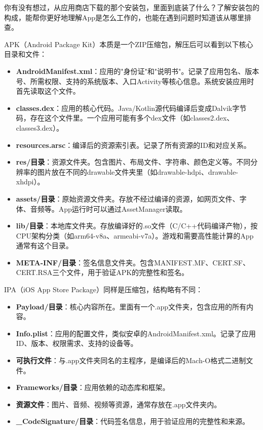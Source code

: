 
你有没有想过，从应用商店下载的那个安装包，里面到底装了什么？了解安装包的构成，能帮你更好地理解App是怎么工作的，也能在遇到问题时知道该从哪里排查。


APK（Android Package Kit）本质是一个ZIP压缩包，解压后可以看到以下核心目录和文件：

\begin{itemize}
  \item \textbf{AndroidManifest.xml}：应用的"身份证"和"说明书"。记录了应用包名、版本号、所需权限、支持的系统版本、入口Activity等核心信息。系统安装应用时首先读取这个文件。
  \item \textbf{classes.dex}：应用的核心代码。Java/Kotlin源代码编译后变成Dalvik字节码，存在这个文件里。一个应用可能有多个dex文件（如classes2.dex、classes3.dex）。
  \item \textbf{resources.arsc}：编译后的资源索引表。记录了所有资源的ID和对应关系。
  \item \textbf{res/目录}：资源文件夹。包含图片、布局文件、字符串、颜色定义等。不同分辨率的图片放在不同的drawable文件夹里（如drawable-hdpi、drawable-xhdpi）。
  \item \textbf{assets/目录}：原始资源文件夹。存放不经过编译的资源，如网页文件、字体、音频等。App运行时可以通过AssetManager读取。
  \item \textbf{lib/目录}：本地库文件夹。存放编译好的.so文件（C/C++代码编译产物），按CPU架构分类（如arm64-v8a、armeabi-v7a）。游戏和需要高性能计算的App通常有这个目录。
  \item \textbf{META-INF/目录}：签名信息文件夹。包含MANIFEST.MF、CERT.SF、CERT.RSA三个文件，用于验证APK的完整性和签名。
\end{itemize}


IPA（iOS App Store Package）同样是压缩包，结构略有不同：

\begin{itemize}
  \item \textbf{Payload/目录}：核心内容所在。里面有一个.app文件夹，包含应用的所有内容。
  \item \textbf{Info.plist}：应用的配置文件，类似安卓的AndroidManifest.xml。记录了应用ID、版本、权限需求、支持的设备等。
  \item \textbf{可执行文件}：与.app文件夹同名的主程序，是编译后的Mach-O格式二进制文件。
  \item \textbf{Frameworks/目录}：应用依赖的动态库和框架。
  \item \textbf{资源文件}：图片、音频、视频等资源，通常存放在.app文件夹内。
  \item \textbf{\_CodeSignature/目录}：代码签名信息，用于验证应用的完整性和来源。
\end{itemize}

